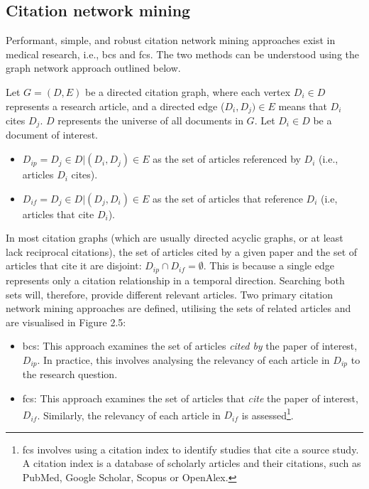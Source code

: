 \documentclass[10pt,oneside]{book}
\begin{document}
\subsection{Citation network mining}

Performant, simple, and robust citation network mining approaches exist in medical research, i.e., \gls*{bcs} and \gls*{fcs}. The two methods can be understood using the graph network approach outlined below.

\begin{tcolorbox}[title=Citation Network Definitions] 
\small
Let $G = (D, E)$ be a directed citation graph, where each vertex $D_i \in D$ represents a research article, and a directed edge ($D_i, D_j) \in E$ means that $D_i$ cites $D_j$. $D$ represents the universe of all documents in $G$. Let $D_i \in D$ be a document of interest. 

\begin{itemize}
    \item $D_{ip} = {D_j \in D | (D_i, D_j) \in E}$ as the set of articles referenced by $D_i$ (i.e., articles $D_i$ cites). 
    \item $D_{if} = {D_j \in D | (D_j, D_i) \in E}$ as the set of articles that reference $D_i$ (i.e, articles that cite $D_i$).

\end{itemize}

In most citation graphs (which are usually directed acyclic graphs, or at least lack reciprocal citations), the set of articles cited by a given paper and the set of articles that cite it are disjoint: $D_{ip} \cap D_{if} = \emptyset$. This is because a single edge represents only a citation relationship in a temporal direction. Searching both sets will, therefore, provide different relevant articles.
\newline
\newline
Two primary citation network mining approaches are defined, utilising the sets of related articles and are visualised in Figure 2.5:

\begin{itemize}
    \item \gls*{bcs}:  This approach examines the set of articles \emph{cited by} the paper of interest, $D_{ip}$.  In practice, this involves analysing the relevancy of each article in $D_{ip}$ to the research question. \cite{lefebvre_cochrane_2011, akers2009systematic}
    \item \gls*{fcs}: This approach examines the set of articles that \emph{cite} the paper of interest, $D_{if}$.  Similarly, the relevancy of each article in $D_{if}$ is assessed\footnote{\gls*{fcs} involves using a citation index to identify studies that cite a source study. A citation index is a database of scholarly articles and their citations, such as PubMed, Google Scholar, Scopus or OpenAlex.}.
\end{itemize}

\end{tcolorbox}
\end{document}
